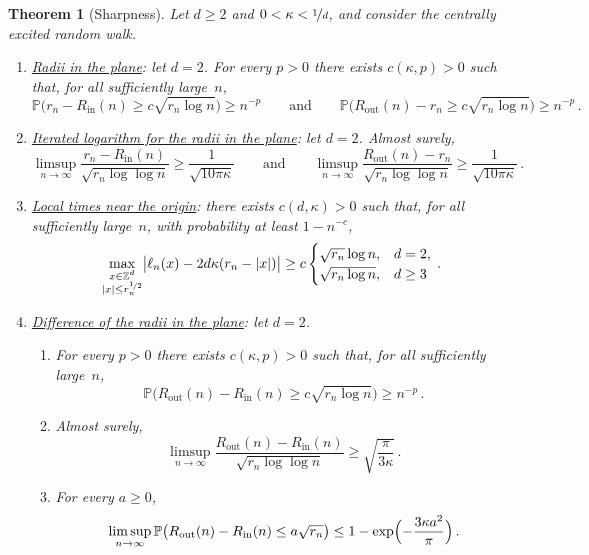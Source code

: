 \documentclass[11pt]{amsart}
\theoremstyle{plain}
\newtheorem{theorem}{Theorem}[section]
\theoremstyle{definition}
\newcommand{\Z}{\mathbb Z}
\renewcommand{\P}{\mathbb P}
\newcommand{\drift}{\kappa}
\newcommand{\nf}{\nicefrac}
\newcommand{\Rin}{R_{\mathrm{in}}}
\newcommand{\Rout}{R_{\mathrm{out}}}
\numberwithin{equation}{section}
\begin{document}
\begin{theorem}[Sharpness]\label{thm:sharp}
Let $d\geq2$ and $0<\drift<\nf{1}{d}$, and consider the centrally excited random walk.
\begin{enumerate}[label=\textup{(\roman*)}]
\item \underline{\emph{Radii in the plane}}: let $d=2$. For every $p>0$ there exists $c(\drift,p)>0$ such that, for all sufficiently large~$n$,
\begin{equation}\label{eq:planar-polynomial-lower}
\P\bigl(r_n-\Rin(n)\geq c\sqrt{r_n\log n}\bigr)\geq n^{-p}
\qquad\text{and}\qquad
\P\bigl(\Rout(n)-r_n\geq c\sqrt{r_n\log n}\bigr)\geq n^{-p}\, .
\end{equation}
\item \underline{\emph{Iterated logarithm for the radii in the plane}}: let $d=2$. Almost surely,
\begin{equation}\label{eq:planar-lil-lower}
\limsup_{n\to\infty}\frac{r_n-\Rin(n)}{\sqrt{r_n\log\log n}}\geq\frac1{\sqrt{10\pi\drift}}
\qquad\text{and}\qquad
\limsup_{n\to\infty}\frac{\Rout(n)-r_n}{\sqrt{r_n\log\log n}}\geq\frac1{\sqrt{10\pi\drift}}\, .
\end{equation}
\item \underline{\emph{Local times near the origin}}: there exists $c(d,\drift)>0$ such that, for all sufficiently large~$n$, with probability at least $1-n^{-c}$,
\begin{equation}\label{eq:sharp-bulk}
\max_{\substack{x\in\Z^d\\|x|\leq r_n^{\nf12}}}\bigl|\ell_n(x)-2d\drift(r_n-|x|)\bigr|
\geq c\begin{cases}\sqrt{r_n}\log n,&d=2,\\\sqrt{r_n\log n},&d\geq3\end{cases}\, .
\end{equation}
\item \underline{\emph{Difference of the radii in the plane}}: let $d=2$.
\begin{enumerate}[label=\textup{(\alph*)}]
\item For every $p>0$ there exists $c(\drift,p)>0$ such that, for all sufficiently large~$n$,
\begin{equation}\label{eq:planar-width-polynomial}
\P\bigl(\Rout(n)-\Rin(n)\geq c\sqrt{r_n\log n}\bigr)\geq n^{-p}\, .
\end{equation}
\item Almost surely,
\begin{equation}\label{eq:planar-width-lil}
\limsup_{n\to\infty}\frac{\Rout(n)-\Rin(n)}{\sqrt{r_n\log\log n}}\geq\sqrt{\frac{\pi}{3\drift}}\, .
\end{equation}
\item For every $a\geq0$,
\begin{equation}\label{eq:planar-width-small}
\limsup_{n\to\infty}\P\bigl(\Rout(n)-\Rin(n)\leq a\sqrt{r_n}\bigr)\leq1-\exp\Bigl(-\frac{3\drift a^2}{\pi}\Bigr)\, .
\end{equation}
\end{enumerate}
\end{enumerate}
\end{theorem}
\end{document}
